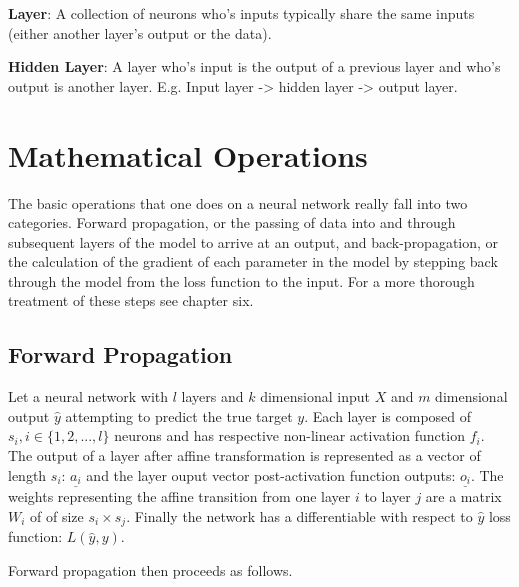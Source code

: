 \documentclass[]{book}
\theoremstyle{definition}
\theoremstyle{definition}
\theoremstyle{definition}
\theoremstyle{remark}
\begin{document}
\textbf{Layer}: A collection of neurons who's inputs typically share the
same inputs (either another layer's output or the data).

\textbf{Hidden Layer}: A layer who's input is the output of a previous
layer and who's output is another layer. E.g. Input layer
-\textgreater{} hidden layer -\textgreater{} output layer.

\section{Mathematical Operations}\label{mathematical-operations}

The basic operations that one does on a neural network really fall into
two categories. Forward propagation, or the passing of data into and
through subsequent layers of the model to arrive at an output, and
back-propagation, or the calculation of the gradient of each parameter
in the model by stepping back through the model from the loss function
to the input. For a more thorough treatment of these steps see
\citet{goodfellow_DL} chapter six.

\subsection{Forward Propagation}\label{forward-propagation}

Let a neural network with \(l\) layers and \(k\) dimensional input \(X\)
and \(m\) dimensional output \(\hat{y}\) attempting to predict the true
target \(y\). Each layer is composed of \(s_i, i \in \{1, 2, ...,l\}\)
neurons and has respective non-linear activation function \(f_i\). The
output of a layer after affine transformation is represented as a vector
of length \(s_i\): \(\underline{a_i}\) and the layer ouput vector
post-activation function outputs: \(\underline{o_i}\). The weights
representing the affine transition from one layer \(i\) to layer \(j\)
are a matrix \(W_i\) of of size \(s_{i} \times s_j\). Finally the
network has a differentiable with respect to \(\hat{y}\) loss function:
\(L(\hat{y}, y)\).

Forward propagation then proceeds as follows.
\end{document}
